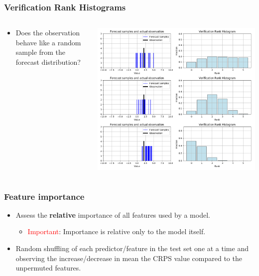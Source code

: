 \documentclass[18pt]{beamer}
\begin{document}
\begin{frame}[t]
  \frametitle{Verification Rank  Histograms}
  \begin{columns}
    \begin{column}[b]{0.3\textwidth}
      \begin{itemize}
      \item Does the observation behave like a random sample from the forecast distribution?
      \end{itemize}
    \end{column}
    \begin{column}{0.7\textwidth}
      \begin{center}
        \includegraphics[scale=0.3]{images/verification_histogram}
      \end{center}
    \end{column}
  \end{columns}
\end{frame}

\begin{frame}
  \frametitle{Feature importance}
  \begin{itemize}
  \item Assess the \textbf{relative} importance of all features used by a model.
    \begin{itemize}
    \item \textcolor{red}{Important}: Importance is relative only to the model itself.
    \end{itemize}
    \item Random shuffling of each predictor/feature in the test set one at a time and observing the increase/decrease in mean the CRPS value compared to the unpermuted features.
  \end{itemize}
\end{frame}
\end{document}

